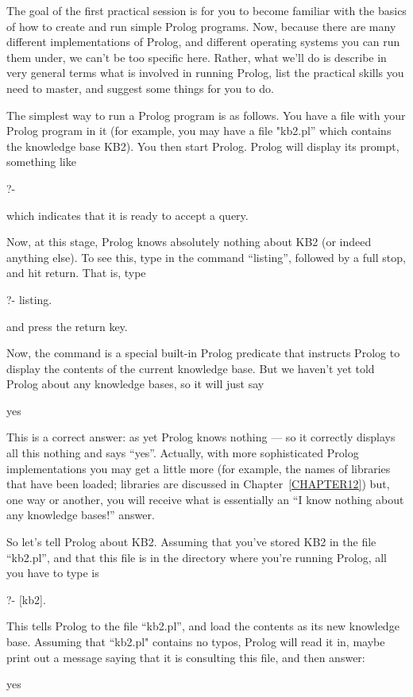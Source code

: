 The goal of the first practical session is for you to become familiar
with the basics of how to create and run simple Prolog programs.  Now,
because there are many different implementations of Prolog, and
different operating systems you can run them under, we can't be too
specific here. Rather, what we'll do is describe in very general terms
what is involved in running Prolog, list the practical skills you
need to master, and suggest some things for you to do.

The simplest way to run a Prolog program is as follows. You have a
file with your Prolog program in it (for example, you may have a file
"kb2.pl'' which contains the knowledge base KB2). You then start Prolog.
Prolog will display its prompt, something like
%
\begin{LPNcodedisplay}
?-
\end{LPNcodedisplay}
%
which indicates that it is ready to accept a query.

Now, at this stage, Prolog knows absolutely nothing about KB2 (or
indeed anything else). To see this, type in the command ``listing'',
 followed by a full stop,
and hit return. That is, type
%
\begin{LPNcodedisplay}
?- listing.
\end{LPNcodedisplay}
%
and press the return key.


Now, the  command is a special built-in Prolog
predicate that instructs Prolog to display the contents of the current
knowledge base.  But we haven't yet told Prolog about any knowledge
bases, so it will just say
%
\begin{LPNcodedisplay}
yes
\end{LPNcodedisplay}
%
This is a correct answer: as yet Prolog knows nothing --- so it
correctly displays all this nothing and says ``yes''. Actually, with
more sophisticated Prolog implementations you may get a little more
(for example, the names of libraries that have been loaded; libraries
are discussed in Chapter~\ref{CHAPTER12})  but, one way or another,
you will receive what is essentially an ``I know nothing about any
knowledge bases!'' answer.

So let's tell Prolog about KB2. Assuming that you've stored KB2 in the
file ``kb2.pl'', and that this file is in the  directory where
you're running Prolog, all you have to type is
%
\begin{LPNcodedisplay}
?- [kb2].
\end{LPNcodedisplay}
This tells Prolog to  the file ``kb2.pl'', and load the
contents as its new knowledge base. Assuming that  ``kb2.pl"
contains no typos, Prolog will read it in, maybe print out a message
saying that it is consulting this file, and then answer:
%
\begin{LPNcodedisplay}
yes
\end{LPNcodedisplay}


